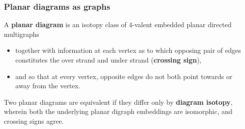 \documentclass[presentation]{beamer}
\begin{document}
\begin{frame}
  \frametitle{Planar diagrams as graphs}
  \begin{definition}
    A \textbf{planar diagram} is an isotopy class of 4-valent embedded
    planar directed multigraphs
    \begin{itemize}
    \item together with information at each vertex as to which opposing
      pair of edges constitutes the over strand and under strand
      (\textbf{crossing sign}),
    \item and so that at every vertex, opposite
      edges do not both point towards or away from the vertex.
    \end{itemize}

  \end{definition}


  Two planar diagrams are equivalent if they differ only by
  \textbf{diagram isotopy}, wherein both the underlying planar digraph
  embeddings are isomorphic, and crossing signs agree.
\end{frame}
\end{document}
